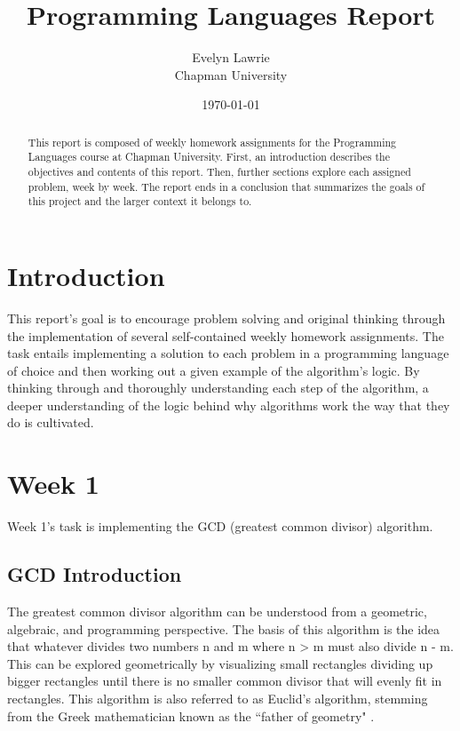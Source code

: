 \documentclass{article}
\title{Programming Languages Report}
\author{Evelyn Lawrie\\ Chapman University}
\date{\today}
\theoremstyle{theorem}
\theoremstyle{definition}
\theoremstyle{remark}
\begin{document}
\maketitle

\begin{abstract}
This report is composed of weekly homework assignments for the Programming Languages course at Chapman University. First, an introduction describes the objectives and contents of this report. Then, further sections explore each assigned problem, week by week. The report ends in a conclusion that summarizes the goals of this project and the larger context it belongs to. 
\end{abstract}

\tableofcontents

\section{Introduction}\label{intro}

This report's goal is to encourage problem solving and original thinking through the implementation of several self-contained weekly homework assignments. The task entails implementing a solution to each problem in a programming language of choice and then working out a given example of the algorithm's logic. By thinking through and thoroughly understanding each step of the algorithm, a deeper understanding of the logic behind why algorithms work the way that they do is cultivated. 

\section{Week 1}

Week 1's task is implementing the GCD (greatest common divisor) algorithm. 

\subsection{GCD Introduction}

The greatest common divisor algorithm can be understood from a geometric, algebraic, and programming perspective. The basis of this algorithm is the idea that whatever divides two numbers n and m where n \textgreater \text{} m must also divide n - m. This can be explored geometrically by visualizing small rectangles dividing up bigger rectangles until there is no smaller common divisor that will evenly fit in rectangles. This algorithm is also referred to as Euclid's algorithm, stemming from the Greek mathematician known as the ``father of geometry" \cite{Gcd}.
\end{document}
